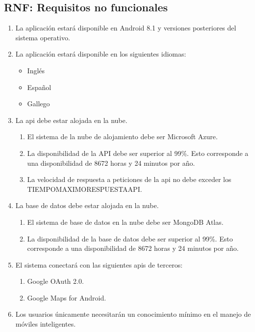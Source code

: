 \subsection{RNF: Requisitos no funcionales}

\begin{enumerate}[label*=RNF \arabic*.]
    \item La aplicación estará disponible en Android 8.1 y versiones posteriores del sistema operativo.
    \item La aplicación estará disponible en los siguientes idiomas:
    \begin{itemize}
        \item Inglés
        \item Español
        \item Gallego
    \end{itemize}
    \item La \acrshort{api} debe estar alojada en la nube.
    \begin{enumerate}[label*=\arabic*.]
        \item El sistema de la nube de alojamiento debe ser Microsoft Azure.
        \item La disponibilidad de la API debe ser superior al 99\%. Esto corresponde a una disponibilidad de 8672 horas y 24 minutos por año.
        \item La velocidad de respuesta a peticiones de la \acrshort{api} no debe exceder los TIEMPO\textunderscore MAXIMO\textunderscore RESPUESTA\textunderscore API.
    \end{enumerate}
    \item La base de datos debe estar alojada en la nube.
    \begin{enumerate}[label*=\arabic*.]
        \item El sistema de base de datos en la nube debe ser MongoDB Atlas.
        \item La disponibilidad de la base de datos debe ser superior al 99\%. Esto corresponde a una disponibilidad de 8672 horas y 24 minutos por año.
    \end{enumerate}
    \item El sistema conectará con las siguientes \acrshort{api}s de terceros:
    \begin{enumerate}[label*=\arabic*.]
        \item Google OAuth 2.0.
        \item Google Maps for Android.
    \end{enumerate}
    \item Los usuarios únicamente necesitarán un conocimiento mínimo en el manejo de móviles inteligentes.
\end{enumerate}

